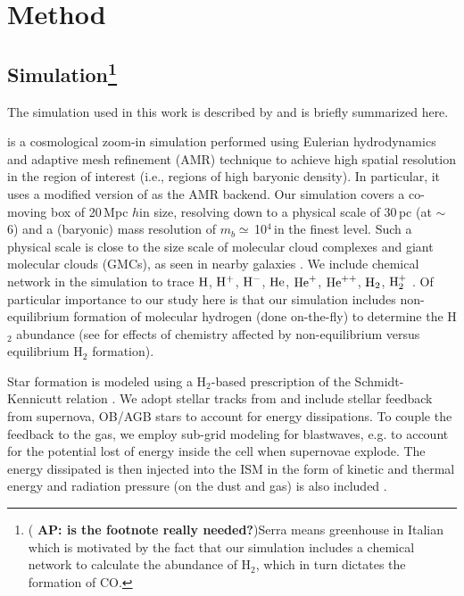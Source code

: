 \documentclass[apj]{emulateapj} %
\newcommand{\AP}[1]{({\bf \color{apcolor} AP: #1})}
\begin{document}
\section{Method} \label{sec:sim}

\subsection{ Simulation\footnote{\AP{is the footnote really needed?}Serra means greenhouse in Italian which is motivated by the
fact that our simulation includes a chemical network to calculate the abundance of H$_2$, which in turn 
dictates the formation of CO.
}}
The simulation used in this work is described by \citealt{Pallottini17a} and is briefly summarized here.

 is a cosmological zoom-in simulation performed using Eulerian hydrodynamics and 
adaptive mesh refinement (AMR) technique to achieve high spatial resolution in the region of interest (i.e., regions of high baryonic density).
In particular, it uses a modified version of  \citep{Teyssier2002a} as the AMR backend.
Our simulation covers a co-moving box of 20\,Mpc $h$\pmOne in size, resolving down to a physical scale of 30\,pc (at \z$\sim$\,6) and a (baryonic) mass resolution of $m_b\simeq$\,10$^4$\,\Msun in the finest level. Such a physical scale is close to the size scale of molecular cloud complexes and giant molecular clouds (GMCs), as seen in nearby galaxies \citep[e.g.,][]{Sanders85a, Federrath13a, Goodman14a}.
We include chemical network in the simulation to trace $\rm{H}$, $\rm{H}^{+}$, $\rm{H}^{-}$, $\rm{He}$, $\rm{He}^{+}$, $\rm{He}^{++}$, $\rm{H}_2$, $\rm{H}_2^{+}$ \citep{Grassi14a,Bovino16a}.
%
Of particular importance to our study here is that our simulation includes non-equilibrium formation of molecular hydrogen (done on-the-fly) to determine the H$_2$ abundance (see \citealt{Pallottini17b} for effects of chemistry affected by non-equilibrium versus equilibrium H$_2$ formation). 

Star formation is modeled using a H$_2$-based prescription of the Schmidt-Kennicutt relation \citep{Krumholz09a}. We adopt stellar tracks from  and include stellar feedback from supernova, OB/AGB stars to account for energy dissipations. To couple the feedback to the gas, we employ sub-grid modeling for blastwaves, e.g. to account for the potential lost of energy inside the cell when supernovae explode. The energy dissipated is then injected into the ISM in the form of kinetic and thermal energy and radiation pressure (on the dust and gas) is also included \citep[see][for details]{Pallottini17a}.
\end{document}
